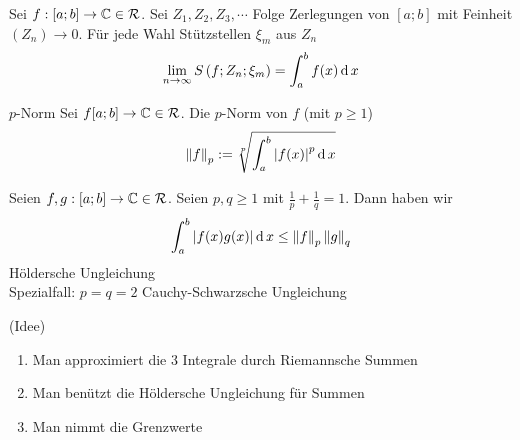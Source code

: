 \begin{Kor}
  Sei $f:[a;b]\to\mathbb{C}\in\mathcal{R}$. Sei $Z_1,Z_2,Z_3,\cdots$ Folge Zerlegungen von $[a;b]$ mit Feinheit $(Z_n)\to 0$. Für jede Wahl Stützstellen $\xi_m$ aus $Z_n$
  \[\displaystyle\lim_{n\rightarrow\infty}S\left( f;Z_n;\xi_m \right)=\int^b_af(x)\operatorname{d} x\]
\end{Kor}
\begin{Def}{$p$-Norm}
  Sei $f[a;b]\to\mathbb{C}\in\mathcal{R}$. Die $p$-Norm von $f$ (mit $p\geq 1$)
  \[\left\| f \right\|_p:=\sqrt[p]{\int^b_a\left| f(x) \right|^p\operatorname{d} x}\]
\end{Def}
\begin{Sat}
  Seien $f,g:[a;b]\to\mathbb{C}\in\mathcal{R}$. Seien $p,q\geq 1$ mit $\frac{1}{p}+\frac{1}{q}=1$. Dann haben wir
  \[\int_a^b\left| f(x)g(x) \right|\operatorname{d} x\leq \left\| f \right\|_p\left\| g \right\|_q\]
  Höldersche Ungleichung\\
  Spezialfall: $p=q=2$ Cauchy-Schwarzsche Ungleichung
\end{Sat}
\begin{Bew}
  (Idee)
  \begin{enumerate}
    \item Man approximiert die 3 Integrale durch Riemannsche Summen
    \item Man benützt die Höldersche Ungleichung für Summen
    \item Man nimmt die Grenzwerte
  \end{enumerate}
\end{Bew}
